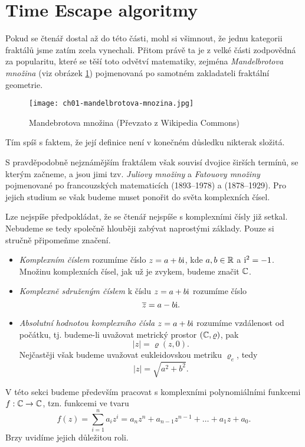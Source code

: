 \section{Time Escape algoritmy}\label{sec:tea}

Pokud se čtenář dostal až do této části, mohl si všimnout, že jednu kategorii fraktálů jsme zatím zcela vynechali. Přitom právě ta je z velké části zodpovědná za popularitu, které se těší toto odvětví matematiky, zejména \emph{Mandelbrotova množina} (viz obrázek \ref{fig:mandebrotova-mnozina}) pojmenovaná po samotném zakladateli fraktální geometrie.
\begin{figure}[h]
    \centering
    \texttt{[image: ch01-mandelbrotova-mnozina.jpg]}
    \caption[Mandebrotova množina]{Mandebrotova množina (Převzato z Wikipedia Commons)\footnotemark}
    \label{fig:mandebrotova-mnozina}
\end{figure}
Tím spíš s faktem, že její definice není v konečném důsledku nikterak složitá.

S pravděpodobně nejznámějším fraktálem však souvisí dvojice širších termínů, se kterým začneme, a jsou jimi tzv. \emph{Juliovy množiny} a \emph{Fatouovy množiny} pojmenované po francouzských matematicích  (1893--1978) a  (1878--1929). Pro jejich studium se však budeme muset ponořit do světa komplexních čísel.

Lze nejspíše předpokládat, že se čtenář nejspíše s komplexními čísly již setkal. Nebudeme se tedy společně hlouběji zabývat naprostými základy. Pouze si stručně připomeňme značení.
\begin{itemize}
    \item \emph{Komplexním číslem} rozumíme číslo $z=a+b\textrm{i}$, kde $a,b\in\mathbb{R}$ a $\textrm{i}^2=-1$. Množinu komplexních čísel, jak už je zvykem, budeme značit $\mathbb{C}$.
    \item \emph{Komplexně sdruženým číslem} k číslu $z=a+b\textrm{i}$ rozumíme číslo
    \[\overline{z}=a-b\textrm{i}.\]
    \item \emph{Absolutní hodnotou komplexního čísla} $z=a+b\textrm{i}$ rozumíme vzdálenost od počátku, tj. budeme-li uvažovat metrický prostor $(\mathbb{C},\varrho)$, pak
    \[|z|=\varrho(z,0).\]
    Nejčastěji však budeme uvažovat eukleidovskou metriku $\varrho_e$, tedy
    \[|z|=\sqrt{a^2+b^2}.\]
\end{itemize}
V této sekci budeme především pracovat s komplexními polynomiálními funkcemi $f:\mathbb{C} \rightarrow \mathbb{C}$, tzn. funkcemi ve tvaru
\[f(z)=\sum_{i=1}^{n}a_iz^i=a_nz^n+a_{n-1}z^{n-1}+\dots+a_1z+a_0.\]
Brzy uvidíme jejich důležitou roli.

